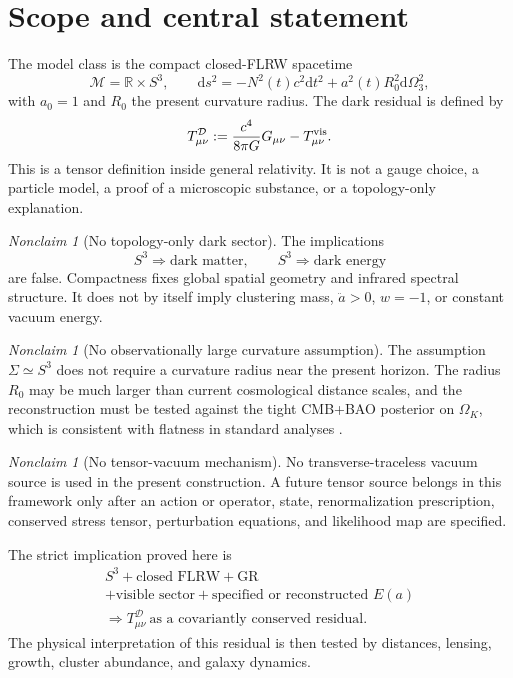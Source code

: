 \documentclass[
  aps,
  prd,
  reprint,
  superscriptaddress,
  nofootinbib,
  floatfix,
  longbibliography
]{revtex4-2}
\theoremstyle{plain}
\theoremstyle{definition}
\theoremstyle{remark}
\newtheorem{nonclaim}[theorem]{Nonclaim}
\newcommand{\dd}{\mathrm d}
\newcommand{\RR}{\mathbb R}
\newcommand{\M}{\mathcal M}
\newcommand{\D}{\mathcal D}
\begin{document}
\section{Scope and central statement}

The model class is the compact closed-FLRW spacetime
\begin{equation}
\M=\RR\times S^3,\qquad
\dd s^2=-N^2(t)c^2\dd t^2+a^2(t)R_0^2\dd\Omega_3^2 ,
\label{eq:metric}
\end{equation}
with $a_0=1$ and $R_0$ the present curvature radius.  The dark residual is
defined by
\begin{equation}
T^{\D}_{\mu\nu}:=\frac{c^4}{8\pi G}G_{\mu\nu}-T^{\rm vis}_{\mu\nu}.
\label{eq:residual_tensor}
\end{equation}
This is a tensor definition inside general relativity.  It is not a gauge
choice, a particle model, a proof of a microscopic substance, or a topology-only
explanation.

\begin{nonclaim}[No topology-only dark sector]
The implications
\[
S^3\Longrightarrow \text{dark matter},\qquad
S^3\Longrightarrow \text{dark energy}
\]
are false.  Compactness fixes global spatial geometry and infrared spectral
structure.  It does not by itself imply clustering mass, $\ddot a>0$, $w=-1$,
or constant vacuum energy.
\end{nonclaim}

\begin{nonclaim}[No observationally large curvature assumption]
The assumption $\Sigma\simeq S^3$ does not require a curvature radius near the
present horizon.  The radius $R_0$ may be much larger than current cosmological
distance scales, and the reconstruction must be tested against the tight
CMB+BAO posterior on $\Omega_K$, which is consistent with flatness in standard
analyses \cite{Planck2018VI}.
\end{nonclaim}

\begin{nonclaim}[No tensor-vacuum mechanism]
No transverse-traceless vacuum source is used in the present construction.  A
future tensor source belongs in this framework only after an action or operator,
state, renormalization prescription, conserved stress tensor, perturbation
equations, and likelihood map are specified.
\end{nonclaim}

The strict implication proved here is
\begin{equation}
\begin{gathered}
S^3+\text{closed FLRW}+\text{GR}\\
+\text{visible sector}
+\text{specified or reconstructed }E(a)\\
\Longrightarrow
T^\D_{\mu\nu}\ \text{as a covariantly conserved residual}.
\end{gathered}
\label{eq:main_result}
\end{equation}
The physical interpretation of this residual is then tested by distances,
lensing, growth, cluster abundance, and galaxy dynamics.
\end{document}
